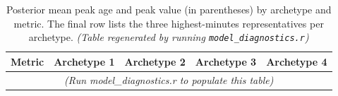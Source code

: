 \begin{table}[htbp]
\centering
\small
\caption{Posterior mean peak age and peak value (in parentheses) by archetype and metric. The final row lists the three highest-minutes representatives per archetype. \textit{(Table regenerated by running \texttt{model\_diagnostics.r})}}
\label{tab:archetype_summary}
\begin{tabular}{lllll}
\toprule
Metric & Archetype 1 & Archetype 2 & Archetype 3 & Archetype 4 \\
\midrule
\multicolumn{5}{c}{\textit{(Run model\_diagnostics.r to populate this table)}} \\
\bottomrule
\end{tabular}
\end{table}

